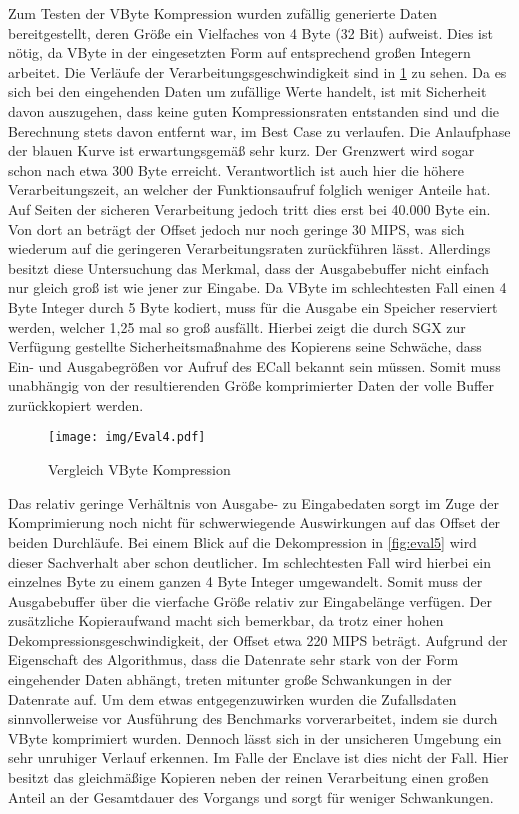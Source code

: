 Zum Testen der VByte Kompression wurden zufällig generierte Daten bereitgestellt, deren Größe ein Vielfaches von 4 Byte (32 Bit) aufweist. Dies ist nötig, da VByte in der eingesetzten Form auf entsprechend großen Integern arbeitet. Die Verläufe der Verarbeitungsgeschwindigkeit sind in \ref{fig:eval4} zu sehen. Da es sich bei den eingehenden Daten um zufällige Werte handelt, ist mit Sicherheit davon auszugehen, dass keine guten Kompressionsraten entstanden sind und die Berechnung stets davon entfernt war, im Best Case zu verlaufen. Die Anlaufphase der blauen Kurve ist erwartungsgemäß sehr kurz. Der Grenzwert wird sogar schon nach etwa 300 Byte erreicht. Verantwortlich ist auch hier die höhere Verarbeitungszeit, an welcher der Funktionsaufruf folglich weniger Anteile hat. Auf Seiten der sicheren Verarbeitung jedoch tritt dies erst bei 40.000 Byte ein. Von dort an beträgt der Offset jedoch nur noch geringe 30 \ac{MIPS}, was sich wiederum auf die geringeren Verarbeitungsraten zurückführen lässt. Allerdings besitzt diese Untersuchung das Merkmal, dass der Ausgabebuffer nicht einfach nur gleich groß ist wie jener zur Eingabe. Da VByte im schlechtesten Fall einen 4 Byte Integer durch 5 Byte kodiert, muss für die Ausgabe ein Speicher reserviert werden, welcher 1,25 mal so groß ausfällt. Hierbei zeigt die durch \ac{SGX} zur Verfügung gestellte Sicherheitsmaßnahme des Kopierens seine Schwäche, dass Ein- und Ausgabegrößen vor Aufruf des \ac{ECall} bekannt sein müssen. Somit muss unabhängig von der resultierenden Größe komprimierter Daten der volle Buffer zurückkopiert werden.

\begin{figure}[H]
	\texttt{[image: img/Eval4.pdf]}
	\centering
	\caption{Vergleich VByte Kompression}
	\label{fig:eval4}
\end{figure}

Das relativ geringe Verhältnis von Ausgabe- zu Eingabedaten sorgt im Zuge der Komprimierung noch nicht für schwerwiegende Auswirkungen auf das Offset der beiden Durchläufe. Bei einem Blick auf die Dekompression in \ref{fig:eval5} wird dieser Sachverhalt aber schon deutlicher. Im schlechtesten Fall wird hierbei ein einzelnes Byte zu einem ganzen 4 Byte Integer umgewandelt. Somit muss der Ausgabebuffer über die vierfache Größe relativ zur Eingabelänge verfügen. Der zusätzliche Kopieraufwand macht sich bemerkbar, da trotz einer hohen Dekompressionsgeschwindigkeit, der Offset etwa 220 \ac{MIPS} beträgt. Aufgrund der Eigenschaft des Algorithmus, dass die Datenrate sehr stark von der Form eingehender Daten abhängt, treten mitunter große Schwankungen in der Datenrate auf. Um dem etwas entgegenzuwirken wurden die Zufallsdaten sinnvollerweise vor Ausführung des Benchmarks vorverarbeitet, indem sie durch VByte komprimiert wurden. Dennoch lässt sich in der unsicheren Umgebung ein sehr unruhiger Verlauf erkennen. Im Falle der Enclave ist dies nicht der Fall. Hier besitzt das gleichmäßige Kopieren neben der reinen Verarbeitung einen großen Anteil an der Gesamtdauer des Vorgangs und sorgt für weniger Schwankungen.

